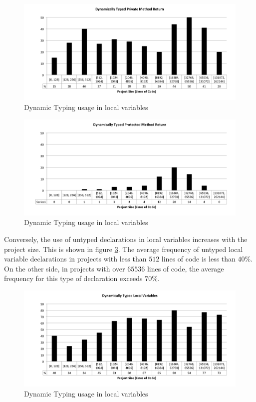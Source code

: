 \documentclass[preprint]{sigplanconf}
\begin{document}
\begin{figure}[ht]
\centering 
\includegraphics[width=1\textwidth]{size_priMethodReturn} 
\caption{Dynamic Typing usage in local variables}
\label{fig:size_priMethodReturn} 
\end{figure}

\begin{figure}[ht]
\centering 
\includegraphics[width=1\textwidth]{size_proMethodReturn} 
\caption{Dynamic Typing usage in local variables}
\label{fig:size_proMethodReturn} 
\end{figure}

Conversely, the use of untyped declarations in local variables increases with the project size. 
This is shown in figure \ref{fig:size_localVariable}. 
The average frequency of untyped local variable declarations in projects with less than $512$ lines of code is less than $40\%$. 
On the other side, in projects with over $65536$ lines of code, the average frequency for this type of declaration exceeds $70\%$.

\begin{figure}[ht]
\centering 
\includegraphics[width=1\textwidth]{size_localVariable} 
\caption{Dynamic Typing usage in local variables}
\label{fig:size_localVariable} 
\end{figure}
\end{document}
